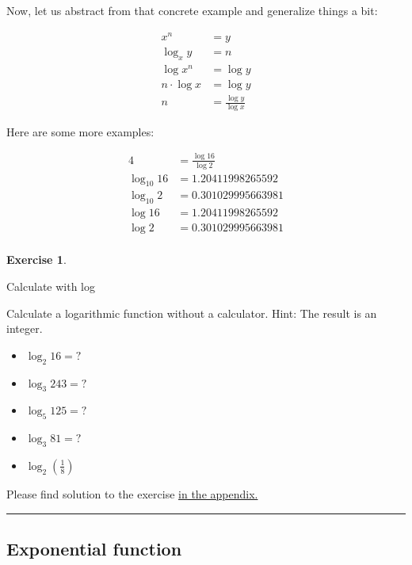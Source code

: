 \documentclass[
  12pt,
  oneside]{book}
\providecommand{\tightlist}{%
  \setlength{\itemsep}{0pt}\setlength{\parskip}{0pt}}
\theoremstyle{definition}
\theoremstyle{definition}
\theoremstyle{definition}
\newtheorem{exercise}{Exercise}[chapter]
\theoremstyle{definition}
\theoremstyle{remark}
\begin{document}
Now, let us abstract from that concrete example and generalize things a bit:

\begin{align*}
x^n &= y \\
\log_x y &= n \\
\log x^n &= \log y \\
n\cdot \log x &= \log y \\
n &= \frac{\log y}{\log x} 
\end{align*}

Here are some more examples:

\begin{align*}
4 &= \frac{\log 16}{\log 2} \\
\log_{10}16 &= 1.20411998265592 \\
\log_{10}2 &= 0.301029995663981 \\
\log 16 &= 1.20411998265592 \\
\log 2 &= 0.301029995663981 \\
\end{align*}

\begin{exercise}
\protect\hypertarget{exr:calcwlog}{}\label{exr:calcwlog}

Calculate with log

Calculate a logarithmic function without a calculator. Hint: The result is an integer.

\begin{itemize}
\tightlist
\item
  \(\log_2 16 = ?\)
\item
  \(\log_3 243 = ?\)
\item
  \(\log_5 125 = ?\)
\item
  \(\log_3 81 = ?\)
\item
  \(\log_2 \left(\frac{1}{8}\right)\)
\end{itemize}

Please find solution to the exercise \hyperref[sol:calcwlog]{in the appendix.}

\begin{center}\rule{0.5\linewidth}{0.5pt}\end{center}

\end{exercise}

\subsection{Exponential function}\label{exponential-function}
\end{document}
